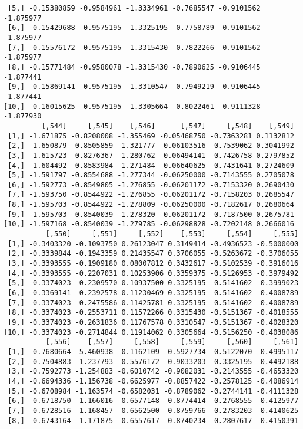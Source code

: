 \documentclass[
  letterpaper,
  DIV=11,
  numbers=noendperiod]{scrreprt}
\begin{document}
\begin{verbatim}
 [5,] -0.15380859 -0.9584961 -1.3334961 -0.7685547 -0.9101562 -1.875977
 [6,] -0.15429688 -0.9575195 -1.3325195 -0.7758789 -0.9101562 -1.875977
 [7,] -0.15576172 -0.9575195 -1.3315430 -0.7822266 -0.9101562 -1.875977
 [8,] -0.15771484 -0.9580078 -1.3315430 -0.7890625 -0.9106445 -1.877441
 [9,] -0.15869141 -0.9575195 -1.3310547 -0.7949219 -0.9106445 -1.877441
[10,] -0.16015625 -0.9575195 -1.3305664 -0.8022461 -0.9111328 -1.877930
         [,544]     [,545]    [,546]      [,547]     [,548]    [,549]
 [1,] -1.671875 -0.8208008 -1.355469 -0.05468750 -0.7363281 0.1132812
 [2,] -1.650879 -0.8505859 -1.321777 -0.06103516 -0.7539062 0.3041992
 [3,] -1.615723 -0.8276367 -1.280762 -0.06494141 -0.7426758 0.2797852
 [4,] -1.604492 -0.8583984 -1.271484 -0.06640625 -0.7431641 0.2724609
 [5,] -1.591797 -0.8554688 -1.277344 -0.06250000 -0.7143555 0.2705078
 [6,] -1.592773 -0.8549805 -1.276855 -0.06201172 -0.7153320 0.2690430
 [7,] -1.593750 -0.8544922 -1.276855 -0.06201172 -0.7158203 0.2685547
 [8,] -1.595703 -0.8544922 -1.278809 -0.06250000 -0.7182617 0.2680664
 [9,] -1.595703 -0.8540039 -1.278320 -0.06201172 -0.7187500 0.2675781
[10,] -1.597168 -0.8540039 -1.279785 -0.06298828 -0.7202148 0.2666016
          [,550]     [,551]     [,552]    [,553]     [,554]     [,555]
 [1,] -0.3403320 -0.1093750 0.26123047 0.3149414 -0.4936523 -0.5000000
 [2,] -0.3339844 -0.1943359 0.21435547 0.3706055 -0.5263672 -0.3706055
 [3,] -0.3393555 -0.1909180 0.08007812 0.3432617 -0.5102539 -0.3916016
 [4,] -0.3393555 -0.2207031 0.10253906 0.3359375 -0.5126953 -0.3979492
 [5,] -0.3374023 -0.2309570 0.10937500 0.3325195 -0.5141602 -0.3999023
 [6,] -0.3369141 -0.2392578 0.11230469 0.3325195 -0.5141602 -0.4008789
 [7,] -0.3374023 -0.2475586 0.11425781 0.3325195 -0.5141602 -0.4008789
 [8,] -0.3374023 -0.2553711 0.11572266 0.3315430 -0.5151367 -0.4018555
 [9,] -0.3374023 -0.2631836 0.11767578 0.3310547 -0.5151367 -0.4028320
[10,] -0.3374023 -0.2714844 0.11914062 0.3305664 -0.5156250 -0.4038086
          [,556]    [,557]     [,558]     [,559]     [,560]     [,561]
 [1,] -0.7680664  5.460938  0.1162109 -0.5927734 -0.5122070 -0.4995117
 [2,] -0.7504883 -1.237793 -0.5576172 -0.9033203 -0.3325195 -0.4492188
 [3,] -0.7592773 -1.254883 -0.6010742 -0.9082031 -0.2143555 -0.4653320
 [4,] -0.6694336 -1.156738 -0.6625977 -0.8857422 -0.2578125 -0.4086914
 [5,] -0.6708984 -1.163574 -0.6582031 -0.8789062 -0.2744141 -0.4111328
 [6,] -0.6718750 -1.166016 -0.6577148 -0.8774414 -0.2768555 -0.4125977
 [7,] -0.6728516 -1.168457 -0.6562500 -0.8759766 -0.2783203 -0.4140625
 [8,] -0.6743164 -1.171875 -0.6557617 -0.8740234 -0.2807617 -0.4150391

\end{verbatim}
\end{document}
